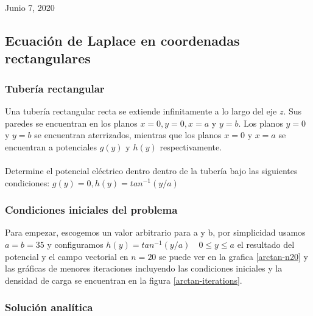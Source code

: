 \documentclass[10pt,journal,compsoc]{IEEEtran}
\begin{document}
\hfill Junio 7, 2020

\subsection{Ecuación de Laplace en coordenadas rectangulares}

\subsubsection{Tubería rectangular}
Una tubería rectangular recta se extiende infinitamente a lo largo del eje \(z\).
Sus paredes se encuentran en los planos \(x=0,y=0,x=a\) y \(y=b\).
Los planos \(y = 0\) y \(y = b\) se encuentran aterrizados, mientras que los planos
\(x = 0\) y \(x = a\) se encuentran a potenciales \(g(y)\) y \(h(y)\) respectivamente.
\\\\
Determine el potencial eléctrico dentro dentro de la tubería bajo las siguientes condiciones:
\(g(y) = 0, h(y) = tan^{-1}(y/a)\)
\\

\subsubsection{Condiciones iniciales del problema}

Para empezar, escogemos un valor arbitrario para a y b, por simplicidad usamos \(a = b = 35 \)
y configuramos \(h(y) = tan^{-1}(y/a) \quad 0\leq y \leq a \)
el resultado del potencial y el campo vectorial en \(n = 20\) se puede ver en la grafica \ref{arctan-n20}
y las gráficas de menores iteraciones incluyendo las condiciones iniciales y la densidad de carga
se encuentran en la figura \ref{arctan-iterations}.

\subsubsection{Solución analítica}
\end{document}
